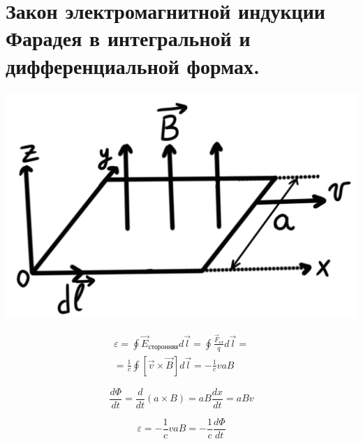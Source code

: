 \section{Закон электромагнитной индукции Фарадея в интегральной и
дифференциальной формах.}

\begin{minipage}[c]{0.4\textwidth} %
    \includegraphics[width=\textwidth]{im/85.png}%
\end{minipage}%
\hfill
\begin{minipage}[c]{0.6\textwidth} %
    \begin{gather*}
        \varepsilon=\oint \vec{E}_{\text{сторонняя}}d\vec{l}=\oint \frac{\vec{F}_{\text{ст}}}{q}d\vec{l}= \\
        =\frac{1}{c}\oint [\vec{v}\times \vec{B}]d\vec{l}=-\frac{1}{c}vaB   
    \end{gather*}
\end{minipage}

\[
\frac{d\Phi}{dt}=\frac{d}{dt}(a \times B)=aB \frac{dx}{dt}=aBv   
\]

\[
\varepsilon=-\frac{1}{c}vaB=-\frac{1}{c}\frac{d\Phi}{dt}   
\]

